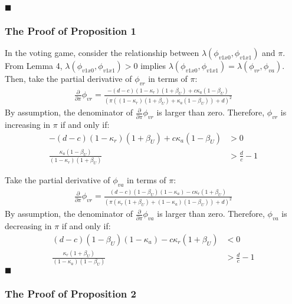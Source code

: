 \hfill $\blacksquare$

\subsubsection{The Proof of Proposition 1}

\par In the voting game, consider the relationship between $\lambda(\phi_{v1x0},\phi_{v1x1})$ and $\pi$. From Lemma 4, $\lambda(\phi_{v1x0},\phi_{v1x1})>0$ implies $\lambda(\phi_{v1x0},\phi_{v1x1})=\lambda(\phi_{vr},\phi_{va})$. Then, take the partial derivative of $\phi_{vr}$ in terms of $\pi$:
\begin{align*}
\frac{\partial}{\partial \pi} \phi_{vr} = \frac{-(d-c)(1-\kappa_r)(1+\beta_U) + c\kappa_a(1-\beta_U)}{\left(\pi\left(\left(1-\kappa_r\right)\left(1+\beta_U\right)+\kappa_a\left(1-\beta_U\right)\right)+d\right)^2}
\end{align*}
\noindent By assumption, the denominator of $\frac{\partial}{\partial \pi} \phi_{vr}$ is larger than zero. Therefore, $\phi_{vr}$ is increasing in $\pi$ if and only if:
\begin{align*}
-(d-c)(1-\kappa_r)(1+\beta_U) + c\kappa_a(1-\beta_U) &> 0 \\
\frac{\kappa_a(1-\beta_U)}{(1-\kappa_r)(1+\beta_U)} &> \frac{d}{c} - 1
\end{align*}

\par Take the partial derivative of $\phi_{va}$ in terms of $\pi$:
\begin{align*}
\frac{\partial}{\partial \pi} \phi_{vr} = \frac{(d-c)(1-\beta_U)(1-\kappa_a) - c\kappa_r(1+\beta_U)}{\left(\pi\left(\kappa_r\left(1+\beta_U\right)+\left(1-\kappa_a\right)\left(1-\beta_U\right)\right)+d\right)^2}
\end{align*}
\noindent By assumption, the denominator of $\frac{\partial}{\partial \pi} \phi_{va}$ is larger than zero. Therefore, $\phi_{va}$ is decreasing in $\pi$ if and only if:
\begin{align*}
(d-c)(1-\beta_U)(1-\kappa_a) - c\kappa_r(1+\beta_U) &< 0 \\
\frac{\kappa_r(1+\beta_U)}{(1-\kappa_a)(1-\beta_U)} &> \frac{d}{c} - 1
\end{align*}
\hfill $\blacksquare$

\subsubsection{The Proof of Proposition 2}

